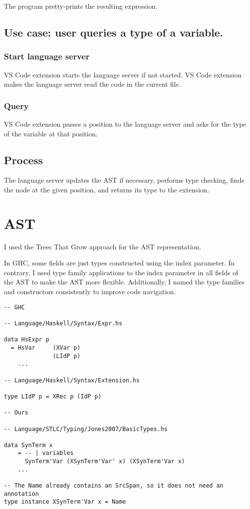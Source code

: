 The program pretty-prints the resulting expression.

\subsection{Use case: user queries a type of a variable.}

\subsubsection{Start language server}

VS Code extension starts the language server if not started.
VS Code extension makes the language server read the code in the current file.

\subsubsection{Query}

VS Code extension passes a position to the language server and asks for the type of the variable at that position.

\subsection{Process}

The language server updates the AST if necessary, performs type checking, finds the node at the given position, and returns its type to the extension.

\section{AST}

I used the Trees That Grow approach \cite{trees-that-grow-2016} for the AST representation.

In GHC, some fields are just types constructed using the index parameter. In contrary, I used type family applications to the index parameter in all fields of the AST to make the AST more flexible. Additionally, I named the type families and constructors consistently to improve code navigation.

\begin{verbatim}
-- GHC

-- Language/Haskell/Syntax/Expr.hs

data HsExpr p
  = HsVar     (XVar p)
              (LIdP p)
    ...

-- Language/Haskell/Syntax/Extension.hs

type LIdP p = XRec p (IdP p)

-- Ours

-- Language/STLC/Typing/Jones2007/BasicTypes.hs

data SynTerm x
    = -- | variables
      SynTerm'Var (XSynTerm'Var' x) (XSynTerm'Var x)
    ...

-- The Name already contains an SrcSpan, so it does not need an annotation
type instance XSynTerm'Var x = Name
\end{verbatim}

